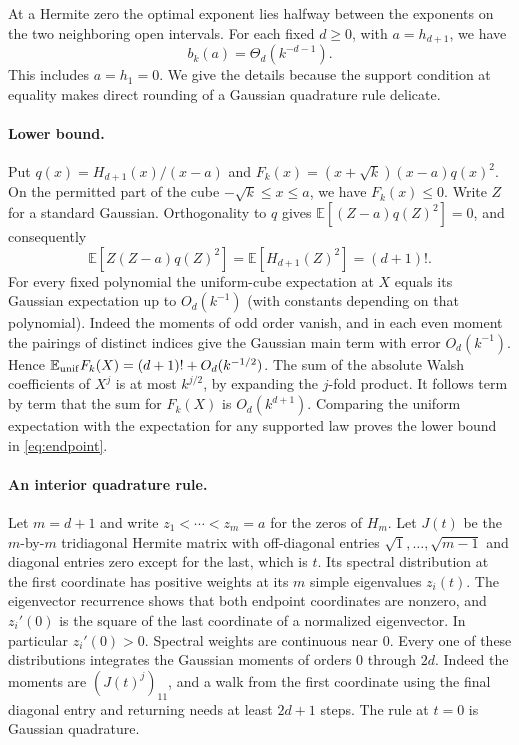 \label{sec:endpoint}

At a Hermite zero the optimal exponent lies halfway between the exponents on
the two neighboring open intervals. For each fixed $d\geq 0$, with $a=h_{d+1}$,
we have
\begin{equation}
  b_k(a)=\Theta_d(k^{-d-1}).                                      \label{eq:endpoint}
\end{equation}
This includes $a=h_1=0$. We give the details because the support condition
at equality makes direct rounding of a Gaussian quadrature rule delicate.

\paragraph{Lower bound.}
Put $q(x)=H_{d+1}(x)/(x-a)$ and $F_k(x)=(x+\sqrt{k})(x-a)q(x)^2$.
On the permitted part of the cube $-\sqrt{k}\le x\le a$, we have $F_k(x)\le0$.
Write $Z$ for a standard Gaussian. Orthogonality to $q$ gives
$\mathbb E[(Z-a)q(Z)^2]=0$, and consequently
\[
  \mathbb E[Z(Z-a)q(Z)^2]=\mathbb E[H_{d+1}(Z)^2]=(d+1)!.
\]
For every fixed polynomial the uniform-cube expectation at $X$ equals its
Gaussian expectation up to $O_d(k^{-1})$ (with constants depending on that
polynomial). Indeed the moments of odd order vanish, and in each even moment
the pairings of distinct indices give the Gaussian main term with error
$O_d(k^{-1})$. Hence $\mathbb E_{\rm unif}F_k(X)=(d+1)!+O_d(k^{-1/2})$.
The sum of the absolute Walsh coefficients of $X^j$ is at most $k^{j/2}$,
by expanding the $j$-fold product. It follows term by term that the sum for
$F_k(X)$ is $O_d(k^{d+1})$. Comparing the uniform expectation with the
expectation for any supported law proves the lower bound in
\eqref{eq:endpoint}.

\paragraph{An interior quadrature rule.}
Let $m=d+1$ and write $z_1<\cdots<z_m=a$ for the zeros of $H_m$.
Let $J(t)$ be the $m$-by-$m$ tridiagonal Hermite matrix with off-diagonal
entries $\sqrt{1},\ldots,\sqrt{m-1}$ and diagonal entries zero except for
the last, which is $t$. Its spectral distribution at the first coordinate
has positive weights at its $m$ simple eigenvalues $z_i(t)$. The eigenvector
recurrence shows that both endpoint coordinates are nonzero, and
$z_i'(0)$ is the square of the last coordinate of a normalized eigenvector.
In particular $z_i'(0)>0$. Spectral weights are continuous near $0$.
Every one of these distributions integrates the Gaussian moments of orders
$0$ through $2d$. Indeed the moments are $(J(t)^j)_{11}$, and a walk from
the first coordinate using the final diagonal entry and returning needs
at least $2d+1$ steps. The rule at $t=0$ is Gaussian quadrature.

